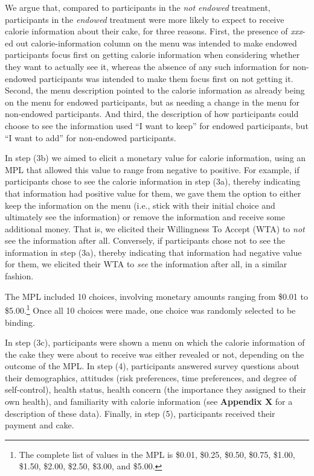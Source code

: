 \documentclass[12pt]{article}
\begin{document}
We argue that, compared to participants in the \emph{not endowed} treatment, participants in the \emph{endowed} treatment were more likely to expect to receive calorie information about their cake, for three reasons. First, the presence of \emph{xxx}-ed out calorie-information column on the menu was intended to make endowed participants focus first on getting calorie information when considering whether they want to actually see it, whereas the absence of any such information for non-endowed participants was intended to make them focus first on not getting it. Second, the menu description pointed to the calorie information as already being on the menu for endowed participants, but as needing a change in the menu for non-endowed participants. And third, the description of how participants could choose to see the information used \enquote{I want to keep} for endowed participants, but \enquote{I want to add} for non-endowed participants.

In step (3b) we aimed to elicit a monetary value for calorie information, using an MPL that allowed this value to range from negative to positive. For example, if participants chose to see the calorie information in step (3a), thereby indicating that information had positive value for them, we gave them the option to either keep the information on the menu (i.e., stick with their initial choice and ultimately see the information) or remove the information and receive some additional money. That is, we elicited their Willingness To Accept (WTA) to \emph{not} see the information after all. Conversely, if participants chose not to see the information in step (3a), thereby indicating that information had negative value for them, we elicited their WTA to \emph{see} the information after all, in a similar fashion.

The MPL included 10 choices, involving monetary amounts ranging from \$0.01 to \$5.00.\footnote{The complete list of values in the MPL is \$0.01, \$0.25, \$0.50, \$0.75, \$1.00, \$1.50, \$2.00, \$2.50, \$3.00, and \$5.00.}  Once all 10 choices were made, one choice was randomly selected to be binding.

In step (3c), participants were shown a menu on which the calorie information of the cake they were about to receive was either revealed or not, depending on the outcome of the MPL. In step (4), participants answered survey questions about their demographics, attitudes (risk preferences, time preferences, and degree of self-control), health status, health concern (the importance they assigned to their own health), and familiarity with calorie information (see \textbf{Appendix X} for a description of these data). Finally, in step (5), participants received their payment and cake.
\end{document}
